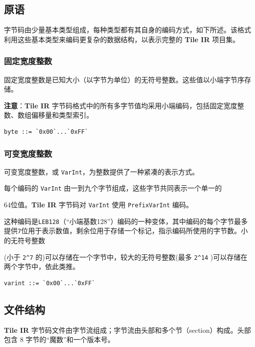 \documentclass{article}
\begin{document}
\subsection{原语}

字节码由少量基本类型组成，每种类型都有其自身的编码方式，如下所述。该格式利用这些基本类型来编码更复杂的数据结构，以表示完整的 \textbf{Tile IR} 项目集。


\subsubsection{固定宽度整数}

固定宽度整数是已知大小（以字节为单位）的无符号整数。这些值以小端字节序存储。


\textbf{注意}：\textbf{Tile IR} 字节码格式中的所有多字节值均采用小端编码，包括固定宽度整数、数组偏移量和类型索引。


\begin{lstlisting}
byte ::= `0x00`...`0xFF`
\end{lstlisting}


\subsubsection{可变宽度整数}

可变宽度整数，或 \texttt{VarInt}，为整数提供了一种紧凑的表示方式。

每个编码的 \texttt{VarInt} 由一到九个字节组成，这些字节共同表示一个单一的

64位值。\textbf{Tile IR} 字节码对 \texttt{VarInt} 使用 \texttt{PrefixVarInt} 编码。

这种编码是\texttt{LEB128}（``小端基数128''）编码的一种变体，其中编码的每个字节最多提供\texttt{7}位用于表示数值，剩余位用于存储一个标记，指示编码所使用的字节数。小的无符号整数

(小于 \texttt{2\textasciicircum{}7} 的)可以存储在一个字节中，较大的无符号整数(最多 \texttt{2\textasciicircum{}14} )可以存储在两个字节中，依此类推。


\begin{lstlisting}
varint ::= `0x00`...`0xFF`
\end{lstlisting}


\subsection{文件结构}

\textbf{Tile IR} 字节码文件由字节流组成；字节流由头部和多个节（section）构成。头部包含 8 字节的``魔数''和一个版本号。
\end{document}
